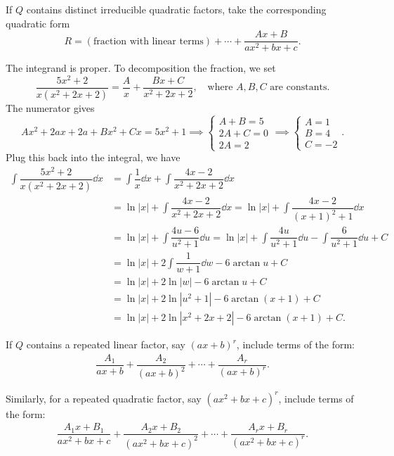 \begin{tcolorbox}
    If $Q$ contains distinct irreducible quadratic factors, take the corresponding quadratic form 
    \[R = (\text{fraction with linear terms}) + \cdots + \dfrac{Ax+B}{ax^2+bx+c}.\]
\end{tcolorbox}
\begin{ex}
    The integrand is proper. To decomposition the fraction, we set
    \[\dfrac{5x^2+2}{x(x^2+2x+2)} = \dfrac{A}{x} + \dfrac{Bx + C}{x^2 + 2x + 2}, \quad \text{where } A, B, C \text{ are constants.} \]
    The numerator gives 
    \[Ax^2 +2ax+2a+Bx^2+Cx = 5x^2 + 1 \implies \begin{cases}
        A+B = 5\\
        2A+C = 0\\
        2A = 2
    \end{cases} \implies \begin{cases}
        A=1\\
        B=4\\
        C=-2
    \end{cases}.\]
    Plug this back into the integral, we have
    \begin{align*}
        \int \dfrac{5x^2+2}{x(x^2+2x+2)} \dd x &= \int \dfrac{1}{x} \dd x + \int \dfrac{4x - 2}{x^2 + 2x + 2} \dd x \\
        &= \ln|x| + \int \dfrac{4x-2}{x^2+2x+2} \dd x = \ln|x| + \int \dfrac{4x-2}{(x+1)^2+1} \dd x \tag{Substitution: $u=x+1$}\\
        &= \ln|x| + \int \dfrac{4u-6}{u^2+1} \dd u = \ln|x| + \int \dfrac{4u}{u^2+1} \dd u - \int \dfrac{6}{u^2+1} \dd u + C\\
        &= \ln|x| + 2\int \dfrac{1}{w+1} \dd w - 6\arctan u + C \\
        &=\ln|x| + 2 \ln|w| - 6\arctan u + C \\
        &=\ln|x| + 2 \ln|u^2+1| - 6\arctan (x+1) + C \\
        &=\ln|x| + 2 \ln|x^2+2x+2| - 6\arctan (x+1) + C.
    \end{align*}
\end{ex} 


\begin{tcolorbox}
    If $Q$ contains a repeated linear factor, say $(ax+b)^r$, include terms of the form:
    \begin{align*}
        \dfrac{A_1}{ax+b} + \dfrac{A_2}{(ax+b)^2} + \cdots + \dfrac{A_r}{(ax+b)^r}.
    \end{align*}
    
    Similarly, for a repeated quadratic factor, say $(ax^2+bx+c)^r$, include terms of the form:
    \begin{align*}
        \dfrac{A_1x+B_1}{ax^2+bx+c} + \dfrac{A_2x+B_2}{(ax^2+bx+c)^2} + \cdots + \dfrac{A_rx+B_r}{(ax^2+bx+c)^r}.
    \end{align*}
\end{tcolorbox}


